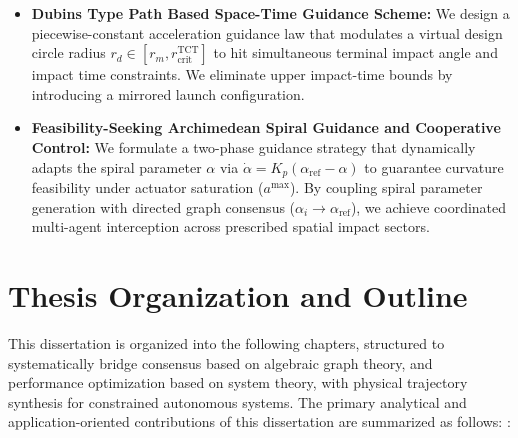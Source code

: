\begin{itemize}
\begin{itemize}
            \item For two loops/cycles, partial overlap between cycles ($s > 0$) strictly improves $\mathcal{H}_2$ performance, compared to non-overlapping loop configurations.
        \end{itemize}
    \item \textbf{Dubins Type Path Based Space-Time Guidance Scheme:} We design a piecewise-constant acceleration guidance law that modulates a virtual design circle radius $r_d \in [r_m, r_{\text{crit}}^{\text{TCT}}]$ to hit simultaneous terminal impact angle and impact time constraints. We eliminate upper impact-time bounds by introducing a mirrored launch configuration. 
    \item \textbf{Feasibility-Seeking Archimedean Spiral Guidance and Cooperative Control:} We formulate a two-phase guidance strategy that dynamically adapts the spiral parameter $\alpha$ via $\dot{\alpha} = K_p(\alpha_{\text{ref}} - \alpha)$ to guarantee curvature feasibility under actuator saturation ($a^{\text{max}}$). By coupling spiral parameter generation with directed graph consensus ($\alpha_i \to \alpha_{\text{ref}}$), we achieve coordinated multi-agent interception across prescribed spatial impact sectors.
\end{itemize}


\section{Thesis Organization and Outline}\label{sec:thesis_organization}
This dissertation is organized into the following chapters, structured to systematically bridge consensus based on algebraic graph theory, and performance optimization based on system theory, with physical trajectory synthesis for constrained autonomous systems. The primary analytical and application-oriented contributions of this dissertation are summarized as follows:
:

